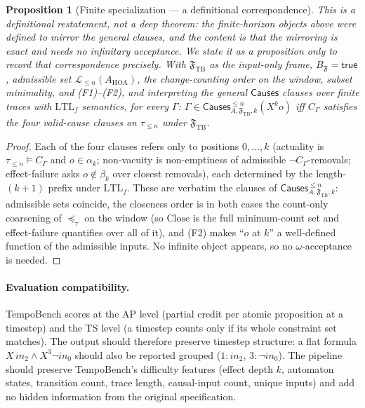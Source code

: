 \documentclass[11pt]{article}
\newtheorem{proposition}{Proposition}
\theoremstyle{remark}
\newcommand{\LTLf}{\mathrm{LTL}_f}
\newcommand{\Close}{\mathrm{Close}}
\newcommand{\Lang}{\mathcal{L}}
\newcommand{\True}{\mathsf{true}}
\newcommand{\Frame}{\mathfrak{F}}
\begin{document}
\begin{proposition}[Finite specialization --- a definitional correspondence]
\label{prop:tb-reduction}
This is a \emph{definitional} restatement, not a deep theorem: the finite-horizon
objects above were \emph{defined} to mirror the general clauses, and the content is
that the mirroring is exact and needs no infinitary acceptance. We state it as a
proposition only to record that correspondence precisely. With
\(\Frame_{\mathrm{TB}}\) as the
input-only frame, \(B_{\Frame}=\True\), admissible set
\(\Lang_{\le n}(A_{\mathrm{HOA}})\), the change-counting order on the window, subset
minimality, and (F1)--(F2), and interpreting the general \(\mathsf{Causes}\) clauses
over finite traces with \(\LTLf\) semantics, for every \(\Gamma\):
\(\Gamma\in\mathsf{Causes}^{\le n}_{A,\Frame_{\mathrm{TB}},k}(X^k o)\) iff
\(C_\Gamma\) satisfies the four valid-cause clauses on \(\tau_{\le n}\) under
\(\Frame_{\mathrm{TB}}\).
\end{proposition}
\begin{proof}
Each of the four clauses refers only to positions \(0,\ldots,k\) (actuality is
\(\tau_{\le n}\models C_\Gamma\) and \(o\in\alpha_k\); non-vacuity is non-emptiness
of admissible \(\neg C_\Gamma\)-removals; effect-failure asks \(o\notin\beta_k\)
over closest removals), each determined by the length-\((k{+}1)\) prefix under
\(\LTLf\). These are verbatim the clauses of
\(\mathsf{Causes}^{\le n}_{A,\Frame_{\mathrm{TB}},k}\): admissible sets coincide,
the closeness order is in both cases the count-only coarsening of \(\preceq_\tau\)
on the window (so \(\Close\) is the full minimum-count set and effect-failure
quantifies over all of it), and (F2) makes ``\(o\) at \(k\)'' a well-defined
function of the admissible inputs. No infinite object appears, so no
\(\omega\)-acceptance is needed.
\end{proof}

\paragraph{Evaluation compatibility.} TempoBench scores at the AP level (partial
credit per atomic proposition at a timestep) and the TS level (a timestep counts
only if its whole constraint set matches). The output should therefore preserve
timestep structure: a flat formula \(X\,in_2\land X^3\neg in_0\) should also be
reported grouped (\(1\!:in_2\), \(3\!:\neg in_0\)). The pipeline should preserve
TempoBench's difficulty features (effect depth \(k\), automaton states, transition
count, trace length, causal-input count, unique inputs) and add no hidden
information from the original specification.
\end{document}
